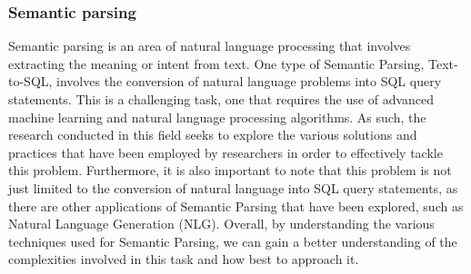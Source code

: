 \subsubsection{Semantic parsing} Semantic parsing is an area of natural language processing that involves extracting the meaning or intent from text. One type of Semantic Parsing, Text-to-SQL, involves the conversion of natural language problems into SQL query statements. This is a challenging task, one that requires the use of advanced machine learning and natural language processing algorithms. As such, the research conducted in this field seeks to explore the various solutions and practices that have been employed by researchers in order to effectively tackle this problem. Furthermore, it is also important to note that this problem is not just limited to the conversion of natural language into SQL query statements, as there are other applications of Semantic Parsing that have been explored, such as Natural Language Generation (NLG). Overall, by understanding the various techniques used for Semantic Parsing, we can gain a better understanding of the complexities involved in this task and how best to approach it.